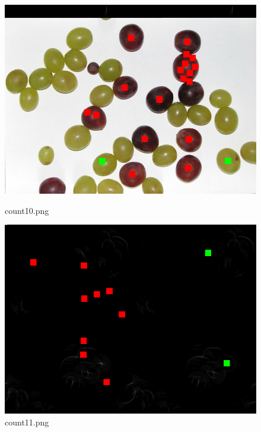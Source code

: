 \documentclass{classrep}
\begin{document}
\begin{figure}
  \begin{minipage}{0.3\linewidth}
    \centering
    \includegraphics[width=\textwidth]{gfx/count10_overlayed.png}
    \caption{count10.png}
    \label{fig:c10}
  \end{minipage}
  \hspace{0.5cm}
  \begin{minipage}{0.3\linewidth}
    \centering
    \includegraphics[width=\textwidth]{gfx/count11_overlayed.png}
    \caption{count11.png}
    \label{fig:c11}
  \end{minipage}
  \begin{minipage}{0.3\linewidth}
    \centering

\end{minipage}
\end{figure}
\end{document}

